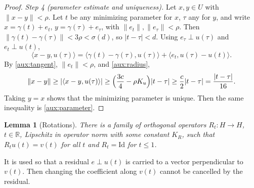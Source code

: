 \documentclass[11pt]{article}
\newcommand{\R}{\mathbb R}
\newcommand{\norm}[1]{\lVert #1\rVert}
\newcommand{\ip}[2]{\langle #1,#2\rangle}
\newtheorem{lemma}[theorem]{Lemma}
\theoremstyle{definition}
\numberwithin{equation}{section}
\begin{document}
\begin{proof}
\emph{Step 4 (parameter estimate and uniqueness).} Let \(x,y\in U\) with
\(\norm{x-y}<\rho\). Let \(t\) be any minimizing parameter for \(x\), \(\tau\)
any for \(y\), and write \(x=\gamma(t)+e_t\), \(y=\gamma(\tau)+e_\tau\), with
\(\norm{e_t},\norm{e_\tau}<\rho\). Then
\(\norm{\gamma(t)-\gamma(\tau)}<3\rho<\sigma(d)\), so \(|t-\tau|<d\). Using
\(e_\tau\perp u(\tau)\) and \(e_t\perp u(t)\),
\[
 \ip{x-y}{u(\tau)}
 =\ip{\gamma(t)-\gamma(\tau)}{u(\tau)}+\ip{e_t}{u(\tau)-u(t)} .
\]
By \eqref{aux:tangent}, \(\norm{e_t}<\rho\), and \eqref{aux:radius},
\[
 \norm{x-y}\ge|\ip{x-y}{u(\tau)}|
 \ge\Bigl(\frac{3c}4-\rho K_u\Bigr)|t-\tau|\ge\frac c2|t-\tau|
 =\frac{|t-\tau|}{16}.
\]
Taking \(y=x\) shows that the minimizing parameter is unique. Then the same
inequality is \eqref{aux:parameter}.
\end{proof}

\begin{lemma}[Rotations]\label{aux:rotation}
There is a family of orthogonal operators \(R_t:H\to H\), \(t\in\R\),
Lipschitz in operator norm with some constant \(K_R\), such that
\(R_tu(t)=v(t)\) for all \(t\) and \(R_t=\mathrm{Id}\) for \(t\le1\).
\end{lemma}
It is used so that a residual \(e\perp u(t)\) is carried to a vector
perpendicular to \(v(t)\). Then changing the coefficient along \(v(t)\)
cannot be cancelled by the residual.
\end{document}
